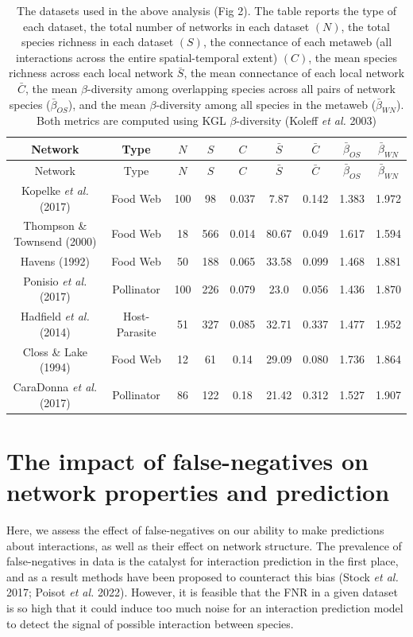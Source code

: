 \documentclass[10pt,oneside]{article}
\begin{document}
\hypertarget{tbl:id}{}
\begin{longtable}[]{@{}ccccccccc@{}}
\caption{\label{tbl:id}The datasets used in the above analysis (Fig 2).
The table reports the type of each dataset, the total number of networks
in each dataset \((N)\), the total species richness in each dataset
\((S)\), the connectance of each metaweb (all interactions across the
entire spatial-temporal extent) \((C)\), the mean species richness
across each local network \(\bar{S}\), the mean connectance of each
local network \(\bar{C}\), the mean \(\beta\)-diversity among
overlapping species across all pairs of network species
(\(\bar{\beta}_{OS}\)), and the mean \(\beta\)-diversity among all
species in the metaweb (\(\bar{\beta}_{WN}\)). Both metrics are computed
using KGL \(\beta\)-diversity (Koleff \emph{et al.}
2003)}\tabularnewline
\toprule
Network & Type & \(N\) & \(S\) & \(C\) & \(\bar{S}\) & \(\bar{C}\) &
\(\bar{\beta}_{OS}\) & \(\bar{\beta}_{WN}\)\tabularnewline
\midrule
\endfirsthead
\toprule
Network & Type & \(N\) & \(S\) & \(C\) & \(\bar{S}\) & \(\bar{C}\) &
\(\bar{\beta}_{OS}\) & \(\bar{\beta}_{WN}\)\tabularnewline
\midrule
\endhead
Kopelke \emph{et al.} (2017) & Food Web & 100 & 98 & 0.037 & 7.87 &
0.142 & 1.383 & 1.972\tabularnewline
Thompson \& Townsend (2000) & Food Web & 18 & 566 & 0.014 & 80.67 &
0.049 & 1.617 & 1.594\tabularnewline
Havens (1992) & Food Web & 50 & 188 & 0.065 & 33.58 & 0.099 & 1.468 &
1.881\tabularnewline
Ponisio \emph{et al.} (2017) & Pollinator & 100 & 226 & 0.079 & 23.0 &
0.056 & 1.436 & 1.870\tabularnewline
Hadfield \emph{et al.} (2014) & Host-Parasite & 51 & 327 & 0.085 & 32.71
& 0.337 & 1.477 & 1.952\tabularnewline
Closs \& Lake (1994) & Food Web & 12 & 61 & 0.14 & 29.09 & 0.080 & 1.736
& 1.864\tabularnewline
CaraDonna \emph{et al.} (2017) & Pollinator & 86 & 122 & 0.18 & 21.42 &
0.312 & 1.527 & 1.907\tabularnewline
\bottomrule
\end{longtable}

\hypertarget{the-impact-of-false-negatives-on-network-properties-and-prediction}{%
\section{The impact of false-negatives on network properties and
prediction}\label{the-impact-of-false-negatives-on-network-properties-and-prediction}}

Here, we assess the effect of false-negatives on our ability to make
predictions about interactions, as well as their effect on network
structure. The prevalence of false-negatives in data is the catalyst for
interaction prediction in the first place, and as a result methods have
been proposed to counteract this bias (Stock \emph{et al.} 2017; Poisot
\emph{et al.} 2022). However, it is feasible that the FNR in a given
dataset is so high that it could induce too much noise for an
interaction prediction model to detect the signal of possible
interaction between species.
\end{document}
